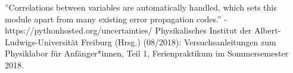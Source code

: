 \documentclass[11pt,a4paper]{article}
\begin{document}
\begin{thebibliography}{9}
''Correlations between variables are automatically handled, which sets this module apart from many existing error propagation codes.'' - https://pythonhosted.org/uncertainties/
 Physikalisches Institut der Albert-Ludwigs-Universität Freiburg (Hrsg.) (08/2018): Versuchsanleitungen zum Physiklabor für Anfänger*innen, Teil 1, Ferienpraktikum im Sommersemester 2018.
\end{thebibliography}
\end{document}
